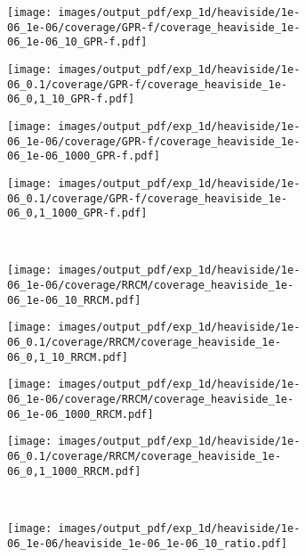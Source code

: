 \documentclass[a4paper,14pt]{extarticle}
\begin{document}
\begin{figure}%
  \centering
  \begin{subfigure}[b]{0.25\linewidth}
    \texttt{[image: images/output\_pdf/exp\_1d/heaviside/1e-06\_1e-06/coverage/GPR-f/coverage\_heaviside\_1e-06\_1e-06\_10\_GPR-f.pdf]}
  \end{subfigure}%
  \begin{subfigure}[b]{0.25\linewidth}
    \texttt{[image: images/output\_pdf/exp\_1d/heaviside/1e-06\_0.1/coverage/GPR-f/coverage\_heaviside\_1e-06\_0,1\_10\_GPR-f.pdf]}
  \end{subfigure}%
  \begin{subfigure}[b]{0.25\linewidth}
    \texttt{[image: images/output\_pdf/exp\_1d/heaviside/1e-06\_1e-06/coverage/GPR-f/coverage\_heaviside\_1e-06\_1e-06\_1000\_GPR-f.pdf]}
  \end{subfigure}%
  \begin{subfigure}[b]{0.25\linewidth}
    \texttt{[image: images/output\_pdf/exp\_1d/heaviside/1e-06\_0.1/coverage/GPR-f/coverage\_heaviside\_1e-06\_0,1\_1000\_GPR-f.pdf]}
  \end{subfigure}\\
  \begin{subfigure}[b]{0.25\linewidth}
    \texttt{[image: images/output\_pdf/exp\_1d/heaviside/1e-06\_1e-06/coverage/RRCM/coverage\_heaviside\_1e-06\_1e-06\_10\_RRCM.pdf]}
  \end{subfigure}%
  \begin{subfigure}[b]{0.25\linewidth}
    \texttt{[image: images/output\_pdf/exp\_1d/heaviside/1e-06\_0.1/coverage/RRCM/coverage\_heaviside\_1e-06\_0,1\_10\_RRCM.pdf]}
  \end{subfigure}%
  \begin{subfigure}[b]{0.25\linewidth}
    \texttt{[image: images/output\_pdf/exp\_1d/heaviside/1e-06\_1e-06/coverage/RRCM/coverage\_heaviside\_1e-06\_1e-06\_1000\_RRCM.pdf]}
  \end{subfigure}%
  \begin{subfigure}[b]{0.25\linewidth}
    \texttt{[image: images/output\_pdf/exp\_1d/heaviside/1e-06\_0.1/coverage/RRCM/coverage\_heaviside\_1e-06\_0,1\_1000\_RRCM.pdf]}
  \end{subfigure}\\
  \begin{subfigure}[b]{0.25\linewidth}
    \texttt{[image: images/output\_pdf/exp\_1d/heaviside/1e-06\_1e-06/heaviside\_1e-06\_1e-06\_10\_ratio.pdf]}

\end{subfigure}
\end{figure}
\end{document}
